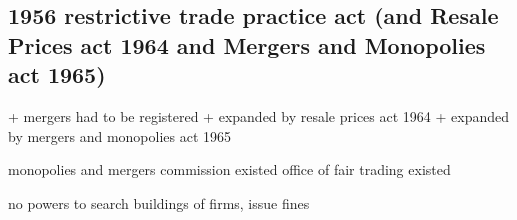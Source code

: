 
\subsection{1956 restrictive trade practice act (and Resale Prices act 1964 and Mergers and Monopolies act 1965)}


+ mergers had to be registered
+ expanded by resale prices act 1964
+ expanded by mergers and monopolies act 1965

monopolies and mergers commission existed
office of fair trading existed

no powers to search buildings of firms, issue fines

